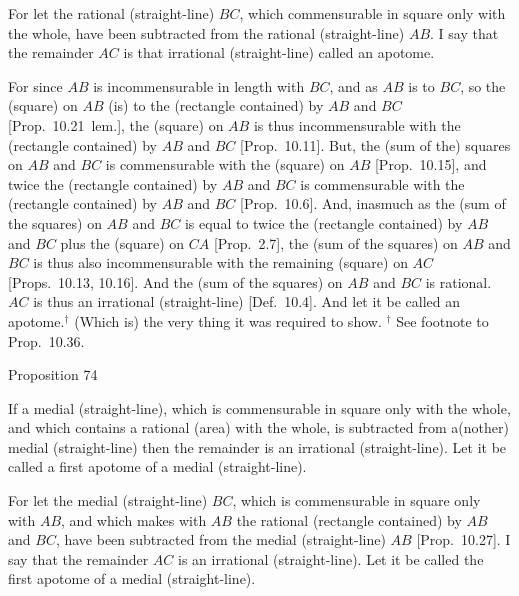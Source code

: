 \epsfysize=0.3in 
\centerline{}

For let the rational (straight-line) $BC$, which commensurable in square only with the whole,  have been subtracted from the
rational (straight-line) $AB$. I say that the remainder $AC$ is that irrational
(straight-line) called an apotome.

For since $AB$ is incommensurable in length with $BC$, and as $AB$ is to
$BC$, so the (square) on $AB$ (is) to the (rectangle contained) by $AB$ and
$BC$ [Prop.~10.21~lem.], the
(square) on $AB$ is thus incommensurable with the (rectangle contained)
by $AB$ and $BC$ [Prop.~10.11]. 
But, the (sum of the) squares on $AB$ and $BC$ is commensurable with the
(square) on $AB$ [Prop.~10.15], and twice
the (rectangle contained) by $AB$ and $BC$ is commensurable with the
(rectangle contained) by $AB$ and $BC$ [Prop.~10.6]. And, inasmuch as the (sum of the squares) on $AB$ and $BC$ is equal to twice the (rectangle contained) by
$AB$ and $BC$ plus the (square) on $CA$ [Prop.~2.7], the (sum of the squares) on $AB$ and $BC$
is thus also incommensurable with the remaining (square) on $AC$ [Props.~10.13, 10.16]. 
And the (sum of the squares) on $AB$ and $BC$ is rational. $AC$ is
thus an irrational (straight-line) [Def.~10.4]. And let it be called an
apotome.$^\dag$ (Which is) the very thing it was required to show.
{\footnotesize\noindent $^\dag$ See footnote to Prop.~10.36.}


\begin{center}
{\large Proposition 74}
\end{center}

If  a medial (straight-line), which is commensurable in square only
with the whole, and which contains a rational (area) with the whole,  is subtracted from a(nother) medial
(straight-line)   then
the remainder is an irrational (straight-line). Let it be called a
first  apotome of a medial (straight-line).

\epsfysize=0.3in 
\centerline{}

For let the medial (straight-line) $BC$, which is commensurable in square only with $AB$,
and which makes with $AB$ the rational (rectangle contained) by $AB$ and $BC$,
have been subtracted from the medial (straight-line) $AB$ [Prop.~10.27]. I say that
the remainder $AC$ is an irrational (straight-line). Let it be
called the first apotome of a medial (straight-line).


